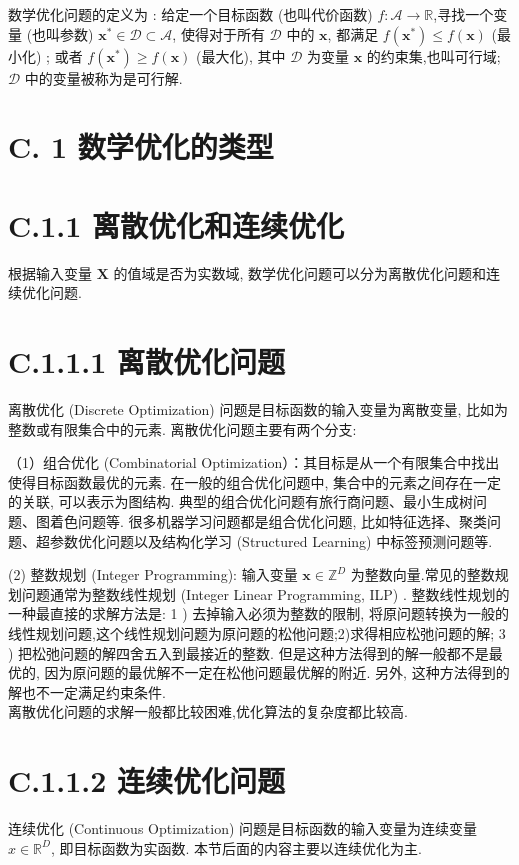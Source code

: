 \documentclass[10pt]{article}
\begin{document}
数学优化问题的定义为 : 给定一个目标函数 (也叫代价函数) $f: \mathcal{A} \rightarrow \mathbb{R}$,寻找一个变量 (也叫参数) $\boldsymbol{x}^{*} \in \mathcal{D} \subset \mathcal{A}$, 使得对于所有 $\mathcal{D}$ 中的 $\boldsymbol{x}$, 都满足 $f\left(\boldsymbol{x}^{*}\right) \leq f(\boldsymbol{x})$ (最小化) ; 或者 $f\left(\boldsymbol{x}^{*}\right) \geq f(\boldsymbol{x})$ (最大化), 其中 $\mathcal{D}$ 为变量 $\boldsymbol{x}$ 的约束集,也叫可行域; $\mathcal{D}$ 中的变量被称为是可行解.

\section*{C. 1 数学优化的类型}
\section*{C.1.1 离散优化和连续优化}
根据输入变量 $\boldsymbol{X}$ 的值域是否为实数域, 数学优化问题可以分为离散优化问题和连续优化问题.

\section*{C.1.1.1 离散优化问题}
离散优化 (Discrete Optimization) 问题是目标函数的输入变量为离散变量, 比如为整数或有限集合中的元素. 离散优化问题主要有两个分支:

（1）组合优化 (Combinatorial Optimization）：其目标是从一个有限集合中找出使得目标函数最优的元素. 在一般的组合优化问题中, 集合中的元素之间存在一定的关联, 可以表示为图结构. 典型的组合优化问题有旅行商问题、最小生成树问题、图着色问题等. 很多机器学习问题都是组合优化问题, 比如特征选择、聚类问题、超参数优化问题以及结构化学习 (Structured Learning) 中标签预测问题等.

(2) 整数规划 (Integer Programming): 输入变量 $\boldsymbol{x} \in \mathbb{Z}^{D}$ 为整数向量.常见的整数规划问题通常为整数线性规划 (Integer Linear Programming, ILP) . 整数线性规划的一种最直接的求解方法是: 1 ) 去掉输入必须为整数的限制, 将原问题转换为一般的线性规划问题,这个线性规划问题为原问题的松他问题;2)求得相应松弛问题的解; 3 ) 把松弛问题的解四舍五入到最接近的整数. 但是这种方法得到的解一般都不是最优的, 因为原问题的最优解不一定在松他问题最优解的附近. 另外, 这种方法得到的解也不一定满足约束条件.\\
离散优化问题的求解一般都比较困难,优化算法的复杂度都比较高.

\section*{C.1.1.2 连续优化问题}
连续优化 (Continuous Optimization) 问题是目标函数的输入变量为连续变量 $x \in \mathbb{R}^{D}$, 即目标函数为实函数. 本节后面的内容主要以连续优化为主.
\end{document}

